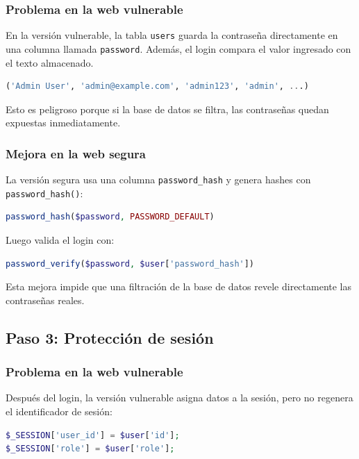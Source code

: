 \documentclass[12pt,a4paper]{article}
\begin{document}
\subsubsection*{Problema en la web vulnerable}

En la versión vulnerable, la tabla \texttt{users} guarda la contraseña directamente en una columna llamada \texttt{password}. Además, el login compara el valor ingresado con el texto almacenado.

\begin{lstlisting}[language=SQL]
('Admin User', 'admin@example.com', 'admin123', 'admin', ...)
\end{lstlisting}

Esto es peligroso porque si la base de datos se filtra, las contraseñas quedan expuestas inmediatamente.

\subsubsection*{Mejora en la web segura}

La versión segura usa una columna \texttt{password\_hash} y genera hashes con \texttt{password\_hash()}:

\begin{lstlisting}[language=PHP]
password_hash($password, PASSWORD_DEFAULT)
\end{lstlisting}

Luego valida el login con:

\begin{lstlisting}[language=PHP]
password_verify($password, $user['password_hash'])
\end{lstlisting}

Esta mejora impide que una filtración de la base de datos revele directamente las contraseñas reales.

\subsection{Paso 3: Protección de sesión}

\subsubsection*{Problema en la web vulnerable}

Después del login, la versión vulnerable asigna datos a la sesión, pero no regenera el identificador de sesión:

\begin{lstlisting}[language=PHP]
$_SESSION['user_id'] = $user['id'];
$_SESSION['role'] = $user['role'];
\end{lstlisting}
\end{document}

